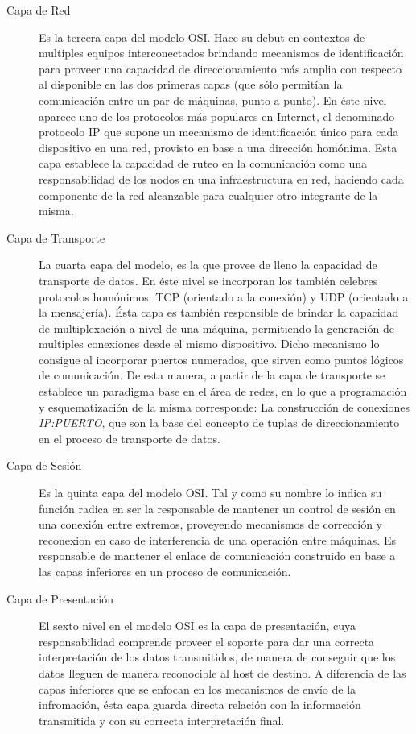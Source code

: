 \begin{intro}
\begin{description}
\item[Capa de Red] Es la tercera capa del modelo OSI. Hace su debut en contextos de multiples equipos interconectados brindando mecanismos de identificación para proveer una capacidad de direccionamiento más amplia con respecto al disponible en las dos primeras capas (que sólo permitían la comunicación entre un par de máquinas, punto a punto). En éste nivel aparece uno de los protocolos más populares en Internet, el denominado protocolo IP que supone un mecanismo de identificación único para cada dispositivo en una red, provisto en base a una dirección homónima. Esta capa establece la capacidad de ruteo en la comunicación como una responsabilidad de los nodos en una infraestructura en red, haciendo cada componente de la red alcanzable para cualquier otro integrante de la misma.

\item[Capa de Transporte] La cuarta capa del modelo, es la que provee de lleno la capacidad de transporte de datos. En éste nivel se incorporan los también celebres protocolos homónimos: TCP (orientado a la conexión) y UDP (orientado a la mensajería). Ésta capa es también responsible de brindar la capacidad de multiplexación a nivel de una máquina, permitiendo la generación de multiples conexiones desde el mismo dispositivo. Dicho mecanismo lo consigue al incorporar puertos numerados, que sirven como puntos lógicos de comunicación. De esta manera, a partir de la capa de transporte se establece un paradigma base en el área de redes, en lo que a programación y esquematización de la misma corresponde: La construcción de conexiones \emph{IP:PUERTO}, que son la base del concepto de tuplas de direccionamiento en el proceso de transporte de datos.

\item[Capa de Sesión] Es la quinta capa del modelo OSI. Tal y como su nombre lo indica su función radica en ser la responsable de mantener un control de sesión en una conexión entre extremos, proveyendo mecanismos de corrección y reconexion en caso de interferencia de una operación entre máquinas. Es responsable de mantener el enlace de comunicación construido en base a las capas inferiores en un proceso de comunicación.

\item[Capa de Presentación] El sexto nivel en el modelo OSI es la capa de presentación, cuya responsabilidad comprende proveer el soporte para dar una correcta interpretación de los datos transmitidos, de manera de conseguir que los datos lleguen de manera reconocible al host de destino. A diferencia de las capas inferiores que se enfocan en los mecanismos de envío de la infromación, ésta capa guarda directa relación con la información transmitida y con su correcta interpretación final.


\end{description}
\end{intro}
